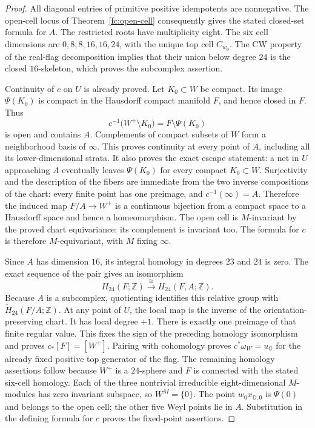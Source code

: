 \documentclass[11pt]{article}
\theoremstyle{definition}
\begin{document}
\begin{proof}
All diagonal entries of primitive positive idempotents are
nonnegative. The open-cell locus of
Theorem~\ref{fc:open-cell} consequently gives the stated
closed-set formula for $A$. The restricted roots have multiplicity
eight. The six cell dimensions are $0,8,8,16,16,24$, with the
unique top cell $C_{w_0}$. The CW property of the real-flag
decomposition implies that their union below degree $24$ is the
closed $16$-skeleton, which proves the subcomplex assertion.

Continuity of $c$ on $U$ is already proved. Let $K_0\subset W$
be compact. Its image $\Psi(K_0)$ is compact in the Hausdorff
compact manifold $F$, and hence closed in $F$. Thus
\[
 c^{-1}\bigl(W^+\setminus K_0\bigr)=F\setminus\Psi(K_0)
\]
is open and contains $A$. Complements of compact subsets of $W$
form a neighborhood basis of $\infty$. This proves continuity
at every point of $A$, including all its lower-dimensional strata.
It also proves the exact escape statement: a net in $U$ approaching
$A$ eventually leaves $\Psi(K_0)$ for every compact $K_0\subset W$.
Surjectivity and the description of the fibers are immediate from
the two inverse compositions of the chart: every finite point has
one preimage, and $c^{-1}(\infty)=A$. Therefore the induced map
$F/A\to W^+$ is a continuous bijection from a compact space to a
Hausdorff space and hence a homeomorphism.
The open cell is $M$-invariant by the proved chart equivariance;
its complement is invariant too. The formula for $c$ is therefore
$M$-equivariant, with $M$ fixing $\infty$.

Since $A$ has dimension $16$, its integral homology in degrees
$23$ and $24$ is zero. The exact sequence of the pair gives an
isomorphism
\[
 H_{24}(F;\mathbb Z)\xrightarrow{\ \cong\ }H_{24}(F,A;\mathbb Z).
\]
Because $A$ is a subcomplex, quotienting identifies this relative
group with $\widetilde H_{24}(F/A;\mathbb Z)$.
At any point of $U$, the local map is the inverse of the
orientation-preserving chart. It has local degree $+1$.
There is exactly one preimage of that finite regular value.
This fixes the sign of the preceding homology isomorphism and
proves $c_*[F]=[W^+]$. Pairing with cohomology proves
$c^*\omega_W=u_{\mathbb O}$ for the already fixed positive
top generator of the flag. The remaining homology assertions
follow because $W^+$ is a $24$-sphere and $F$ is connected with
the stated six-cell homology.
Each of the three nontrivial irreducible eight-dimensional
$M$-modules has zero invariant subspace, so $W^M=\{0\}$.
The point $w_0x_{\mathbb O,0}$ is $\Psi(0)$ and belongs to the
open cell; the other five Weyl points lie in $A$. Substitution
in the defining formula for $c$ proves the fixed-point assertions.
\end{proof}
\end{document}
